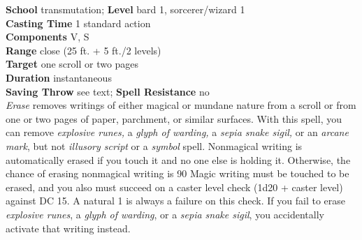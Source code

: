 \textbf{School} transmutation; \textbf{Level} bard 1, sorcerer/wizard 1\\
\textbf{Casting Time} 1 standard action\\
\textbf{Components} V, S\\
\textbf{Range} close (25 ft. + 5 ft./2 levels)\\
\textbf{Target} one scroll or two pages\\
\textbf{Duration} instantaneous\\
\textbf{Saving Throw} see text; \textbf{Spell Resistance} no\\
\textit{Erase }removes writings of either magical or mundane nature from a scroll or from one or two pages of paper, parchment, or similar surfaces. With this spell, you can remove \textit{explosive runes, }a \textit{glyph of warding, }a \textit{sepia snake sigil, }or an \textit{arcane mark}, but not \textit{illusory script }or a \textit{symbol }spell. Nonmagical writing is automatically erased if you touch it and no one else is holding it. Otherwise, the chance of erasing nonmagical writing is 90%
Magic writing must be touched to be erased, and you also must succeed on a caster level check (1d20 + caster level) against DC 15. A natural 1 is always a failure on this check. If you fail to erase \textit{explosive runes}, a \textit{glyph of warding}, or a \textit{sepia snake sigil}, you accidentally activate that writing instead.\\
